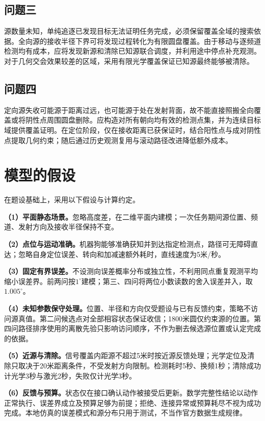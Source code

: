 \documentclass{JXUSTmodeling}
\begin{document}
\subsection{问题三}\label{sub:2.3}
源数量未知，单纯追逐已发现目标无法证明任务完成，必须保留覆盖全域的搜索依据。全向源的接收半径下界可将发现过程转化为有限圆盘覆盖。由于移动与逐频道检测均有成本，应将发现新源和清除已知源联合调度，并利用途中停点补充观测。对于几何交会效果较差的区域，采用有限光学覆盖保证已知源最终能够被清除。

\subsection{问题四}\label{sub:2.4}
定向源失收可能源于距离过远，也可能源于处在发射背面，故不能直接照搬全向覆盖或将阴性点周围圆盘删除。应构造对所有朝向均有效的检测点集，并为连续目标域提供覆盖证明。在定位阶段，仅在接收距离已获保证时，结合阳性点与成对阴性点提取几何约束；随后通过历史观测复用与滚动路径改进降低额外成本。

\section{模型的假设}\label{sec:3}
在题设基础上，采用以下假设与计算约定。

\textbf{（1）平面静态场景。}忽略高度差，在二维平面内建模；一次任务期间源位置、频道、发射方向及接收半径保持不变。

\textbf{（2）点位与运动准确。}机器狗能够准确获知并到达指定检测点，路径可无障碍直达；忽略自身定位误差、转向和加减速额外耗时，直线速度为5米/秒。

\textbf{（3）固定有界误差。}不设测向误差概率分布或独立性，不利用同点重复观测平均缩小误差界。前两问按$1^\circ$建模；第三、四问将两位小数读数的舍入误差并入，取$1.005^\circ$。

\textbf{（4）未知参数保守处理。}位置、半径和方向仅受题设与已有反馈约束，策略不访问源真值。第二问候选点对全部相容状态保证收信；1800米圆仅约束源的位置。第四问路径排序使用的离散先验只影响访问顺序，不作为删去候选源位置或认定完成的依据。

\textbf{（5）近源与清除。}信号覆盖内距源不超过5米时按近源反馈处理；光学定位及清除只取决于20米距离条件，不受发射方向限制。检测耗时5秒、换频1秒；清除成功计光学3秒与激光2秒，失败仅计光学3秒。

\textbf{（6）反馈与预算。}状态仅在接口确认动作被接受后更新。数学完整性结论以动作正常执行、误差界成立及预算足够为前提；拒绝、连接异常或预算耗尽不视为成功完成。本地仿真的误差模式和源分布只用于测试，不当作官方数据生成规律。
\end{document}
